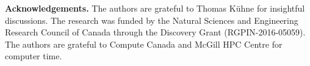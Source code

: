 \documentclass[aip,jcp,reprint,amsmath,amssymb]{revtex4-1}
\begin{document}



\textbf{Acknowledgements.} The authors are grateful to Thomas K\"uhne for insightful discussions. The research was funded by the Natural Sciences and Engineering Research Council of Canada through the Discovery Grant (RGPIN-2016-05059). The authors are grateful to Compute Canada and McGill HPC Centre for computer time.



\end{document}
